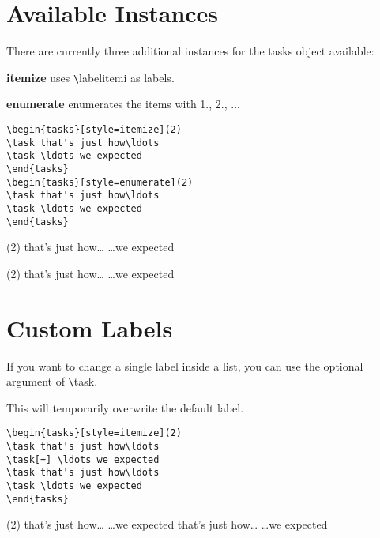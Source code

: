 \documentclass[a4paper,12pt,indent]{article}
\begin{document}
\section{Available Instances}

There are currently three additional instances for the tasks object available:

{\bfseries itemize} uses \verb|\|\textcolor{Tasks}{labelitemi} as labels.

{\bfseries enumerate} enumerates the items with 1., 2., ...

\begin{tcolorbox}[collower=black,colframe=Tasks,colback=white]
    \begin{lstlisting}
\begin{tasks}[style=itemize](2)
\task that's just how\ldots
\task \ldots we expected
\end{tasks}
\begin{tasks}[style=enumerate](2)
\task that's just how\ldots
\task \ldots we expected
\end{tasks}
\end{lstlisting}
        \tcblower
        \begin{tasks}[style=itemize](2)
            \task that's just how\ldots
            \task \ldots we expected
            \end{tasks}
            \begin{tasks}[style=multiplechoice](2)
            \task that's just how\ldots
            \task \ldots we expected
            \end{tasks}
           \end{tcolorbox}

\section{Custom Labels}

If you want to change a single label inside a list, you can use the optional argument of \verb|\|\textcolor{Tasks}{task}.

This will temporarily overwrite the default label.

\begin{tcolorbox}[collower=black,colframe=Tasks,colback=white]
    \begin{lstlisting}
\begin{tasks}[style=itemize](2)
\task that's just how\ldots
\task[+] \ldots we expected
\task that's just how\ldots
\task \ldots we expected
\end{tasks}
\end{lstlisting}
        \tcblower
        \begin{tasks}[style=itemize](2)
            \task that's just how\ldots
            \task[+] \ldots we expected
            \task that's just how\ldots
            \task \ldots we expected
            \end{tasks}
           \end{tcolorbox}
\end{document}
